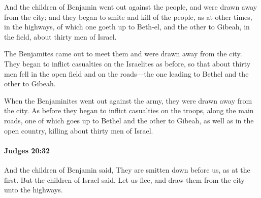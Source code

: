 			\begin{versebox}
					\item[BHS] 
					\item[ASV] And the children of Benjamin went out against the people, and were drawn away from the city; and they began to smite and kill of the people, as at other times, in the highways, of which one goeth up to Beth-el, and the other to Gibeah, in the field, about thirty men of Israel.
					\item[NIV] The Benjamites came out to meet them and were drawn away from the city. They began to inflict casualties on the Israelites as before, so that about thirty men fell in the open field and on the roads—the one leading to Bethel and the other to Gibeah.
					\item[NRSV] When the Benjaminites went out against the army, they were drawn away from the city. As before they began to inflict casualties on the troops, along the main roads, one of which goes up to Bethel and the other to Gibeah, as well as in the open country, killing about thirty men of Israel.
			\end{versebox}

		\paragraph{Judges 20:32} %
			\label{JUDGES-20-32}

			And the children of Benjamin said, They are smitten down before us, as at the first. But the children of Israel said, Let us flee, and draw them from the city unto the highways.

